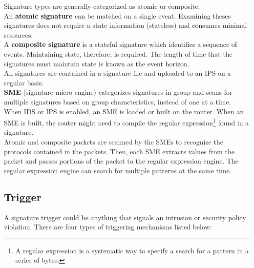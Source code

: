 Signature types are generally categorized as atomic or composite.\\

An \textbf{atomic signature} can be matched on a single event. Examining theses signatures does not require a state information (stateless) and consumes minimal resources.\\

A \textbf{composite signature} is a stateful signature which identifies a sequence of events. Maintaining state, therefore, is required. The length of time that the signatures must maintain state is known as the event horizon.\\

All signatures are contained in a signature file and uploaded to an IPS on a regular basis.\\

\textbf{SME} (signature micro-engine) categorizes signatures in group and scans for multiple signatures based on group characteristics, instead of one at a time. When IDS or IPS is enabled, an SME is loaded or built on the router. When an SME is built, the router might need to compile the regular expression\footnote{A regular expression is a systematic way to specify a search for a pattern in a series of bytes.} found in a signature. \\

Atomic and composite packets are scanned by the SMEs to recognize the protocols contained in the packets. Then, each SME extracts values from the packet and passes portions of the packet to the regular expression engine. The regular expression engine can search for multiple patterns at the same time. 

\subsection{Trigger}

A signature trigger could be anything that signals an intrusion or security policy violation. There are four types of triggering mechanisms listed below:

